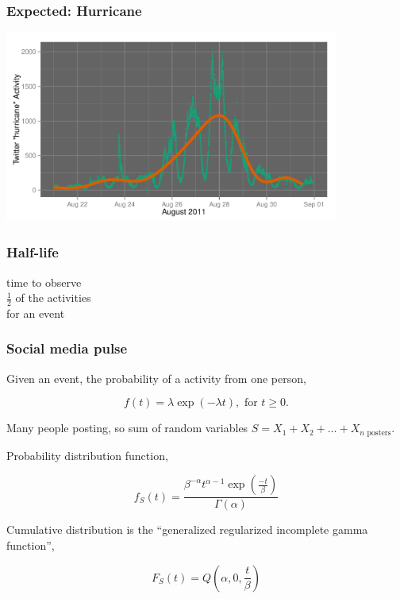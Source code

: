 \documentclass{beamer}
\begin{document}
\begin{frame}\frametitle{Expected: Hurricane}
  \begin{center}
    \includegraphics[width=11cm]{./imgs/SMP_hurricane_trend.pdf}
  \end{center}
\end{frame}



\begin{frame}\frametitle{Half-life}
\begin{center}
{\Huge time to observe \\[6pt] $\frac{1}{2}$ of the activities \\[6pt] for an event}
\end{center}
\end{frame}

\begin{frame}
\frametitle{Social media pulse} 
Given an event, the probability of a activity from one person,

\begin{equation*}
f(t) = \lambda \exp(-\lambda t), \text{ for } t \geq 0.
\end{equation*}

Many people posting, so sum of random variables $S = X_1 + X_2 + \ldots + X_{n \text{ posters}}$.

Probability distribution function,

\begin{equation*}
f_S(t) = \frac{ \beta^{-\alpha} t^{\alpha-1} \exp( \frac{-t}{\beta}) } {\Gamma(\alpha)}
\end{equation*}

Cumulative distribution is the ``generalized regularized incomplete gamma function'',

\begin{equation*}
F_S(t) = Q(\alpha, 0, \frac{ t}{\beta})
\end{equation*}
\end{frame}
\end{document}
